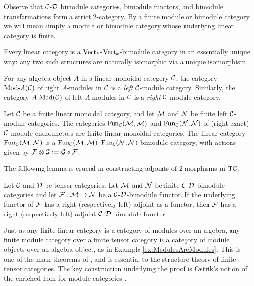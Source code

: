 \documentclass{amsart}
\begin{document}
%
\nid Observe that $\mathcal C$-$\mathcal D$ bimodule categories, bimodule functors, and bimodule transformations form a strict 2-category.  By a finite module or bimodule category we will mean simply a module or bimodule category whose underlying linear category is finite.

\begin{example}
	Every linear category is a $\mathrm{Vect}_k$-$\mathrm{Vect}_k$-bimodule category in an essentially unique way: any two such structures are naturally isomorphic via a unique isomorphism.
\end{example} %

\begin{example} \label{ex:ModulesAreModules}
	For any algebra object $A$ in a linear monoidal category $\mathcal C$, the category $\Mod{}{A}(\cC)$ of right $A$-modules in $\mathcal C$ is a \emph{left} $\mathcal C$-module category.  Similarly, the category $\Mod{A}{}(\cC)$ of left $A$-modules in $\mathcal C$ is a \emph{right} $\mathcal C$-module category.
\end{example} %

\begin{example}
	Let $\mathcal C$ be a finite linear monoidal category, and let $\mathcal M$ and $\mathcal N$ be finite left $\mathcal C$-module categories. The categories $\operatorname{Fun}_{\mathcal C}(\mathcal M, \mathcal M)$ and $\operatorname{Fun}_{\mathcal C}(\mathcal N, \mathcal N)$ of (right exact) $\mathcal C$-module endofunctors are finite linear monoidal categories. The linear category $\operatorname{Fun}_{\mathcal C}(\mathcal M, \mathcal N)$ is a $\operatorname{Fun}_{\mathcal C}(\mathcal M, \mathcal M)$-$\operatorname{Fun}_{\mathcal C}(\mathcal N, \mathcal N)$-bimodule category, with actions given by $\mathcal F \otimes \mathcal G := \mathcal G \circ \mathcal F$. 
\end{example} 

The following lemma is crucial in constructing adjoints of $2$-morphisms in $\mathrm{TC}$.

\begin{lemma} \label{lma:module-adjoint}
Let $\mathcal C$ and $\mathcal D$ be tensor categories. Let  $\mathcal M$ and  $\mathcal N$  be finite $\mathcal C$-$\mathcal D$-bimodule categories and let $\mathcal F: \mathcal M \to \mathcal N$ be a $\mathcal C$-$\mathcal D$-bimodule functor.  If the underlying functor of $\mathcal F$ has a right (respectively left) adjoint as a functor, then $\mathcal F$ has a right (respectively left) adjoint $\mathcal C$-$\mathcal D$-bimodule functor. 
\end{lemma} 


Just as any finite linear category is a category of modules over an algebra, any finite module category over a finite tensor category is a category of module objects over an algebra object, as in Example \ref{ex:ModulesAreModules}.  This is one of the main theorems of \cite{EGNO}, and is essential to the structure theory of finite tensor categories.  The key construction underlying the proof is Ostrik's notion of the enriched hom for module categories \cite{MR1976459, EO-ftc}.  
\end{document}
